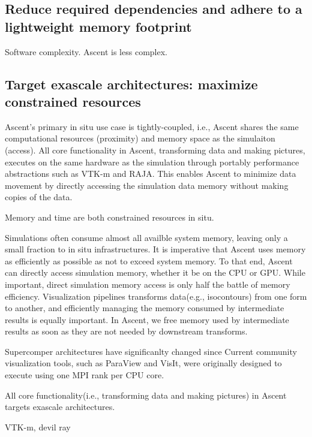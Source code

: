
\subsection{Reduce required dependencies and adhere to a lightweight memory footprint}
Software complexity. Ascent is less complex.

\subsection{Target exascale architectures: maximize constrained resources}
Ascent's primary in situ use case is tightly-coupled, i.e.,
Ascent shares the same computational resources (proximity) and
memory space as the simulaiton (access).
%
All core functionality in Ascent, transforming data
and making pictures, executes on the same hardware as the
simulation through portably performance abstractions such as
VTK-m and RAJA.
%
This enables Ascent to minimize data movement by directly accessing
the simulation data memory without making copies of the data.
%

Memory and time are both constrained resources in situ.

%
Simulations often consume almost all availble system memory,
leaving only a small fraction to in situ infrastructures.
%
It is imperative that Ascent uses memory as efficiently as possible
as not to exceed system memory.
%
To that end, Ascent can directly access simulation memory, whether it be
on the CPU or GPU.
%
While important, direct simulation memory access is only half
the battle of memory efficiency.
%
Visualization pipelines transforms data(e.g., isocontours) from
one form to another, and efficiently managing the memory consumed
by intermediate results is equally important.
%
%
In Ascent, we free memory used by intermediate results as soon
as they are not needed by downstream transforms.
%


%
Supercomper architectures have significanlty changed since
%
Current community visualization tools, such as ParaView and VisIt, were originally
designed to execute using one MPI rank per CPU core.
%

All core functionality(i.e., transforming data and making pictures) in
Ascent targets exascale architectures.

VTK-m, devil ray

